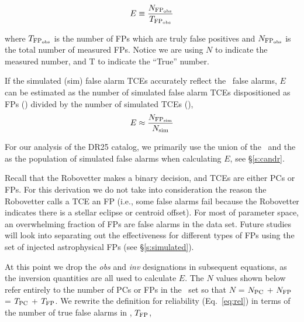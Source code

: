 \begin{equation}
\label{effect1}
E \equiv \frac{N_{\rm FP_{\rm obs}}}{T_{\rm FP_{\rm obs}}}
\end{equation}

\noindent where $T_{\rm FP_{\rm obs}}$ is the number of FPs which are truly false positives and $N_{\rm FP_{\rm obs}}$ is the total number of measured FPs. Notice we are using $N$ to indicate the measured number, and T to indicate the ``True'' number. 

If the simulated (sim) false alarm TCEs accurately reflect the \opstce\ false alarms, $E$ can be estimated as the number of simulated false alarm TCEs dispositioned as FPs (\simfp) divided by the number of simulated TCEs (\simN), 
\begin{equation}
\label{effect2}
E \approx  \frac{N_{\rm FP_{\rm sim}}}{N_{\rm sim}}
\end{equation}

\noindent For our analysis of the DR25 catalog, we primarily use the union of the \invtces\ and the \scrtces{} as the population of simulated false alarms when calculating $E$, see \S\ref{s:candr}.


Recall that the Robovetter makes a binary decision, and TCEs are either PCs or FPs. For this derivation we do not take into consideration the reason the Robovetter calls a TCE an FP (i.e., some false alarms fail because the Robovetter indicates there is a stellar eclipse or centroid offset). For most of parameter space, an overwhelming fraction of FPs are false alarms in the \opstce{} data set. Future studies will look into separating out the effectiveness for different types of FPs using the set of injected astrophysical FPs (see \S\ref{s:simulated}).


At this point we drop the \textit{obs} and \textit{inv} designations in subsequent equations, as the inversion quantities are all used to calculate $E$. The $N$ values shown below refer entirely to the number of PCs or FPs in the \opstce\ set so that $N$ = $N_{\rm PC}$ + $N_{\rm FP}$ = $T_{\rm PC}$ + $T_{\rm FP}$. We rewrite the definition for reliability (Eq.~\ref{eq:rel}) in terms of the number of true false alarms in \opstce, $T_{\rm FP}$,

